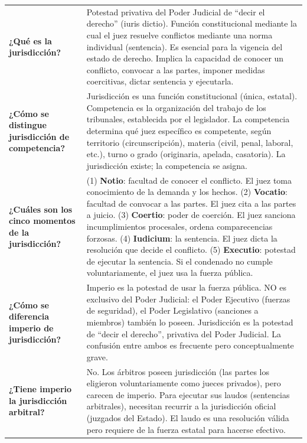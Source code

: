 \documentclass[12pt,oneside]{book}
\begin{document}
\begin{table}[H]
\begin{tabularx}{\textwidth}{
    >{\raggedright\arraybackslash}p{}
    >{\raggedright\arraybackslash}X
}
\textbf{¿Qué es la jurisdicción?} &
Potestad privativa del Poder Judicial de ``decir el derecho'' (iuris dictio). Función constitucional mediante la cual el juez resuelve conflictos mediante una norma individual (sentencia). Es esencial para la vigencia del estado de derecho. Implica la capacidad de conocer un conflicto, convocar a las partes, imponer medidas coercitivas, dictar sentencia y ejecutarla. \\

\textbf{¿Cómo se distingue jurisdicción de competencia?} &
Jurisdicción es una función constitucional (única, estatal). Competencia es la organización del trabajo de los tribunales, establecida por el legislador. La competencia determina qué juez específico es competente, según territorio (circunscripción), materia (civil, penal, laboral, etc.), turno o grado (originaria, apelada, casatoria). La jurisdicción existe; la competencia se asigna. \\

\textbf{¿Cuáles son los cinco momentos de la jurisdicción?} &
(1) \textbf{Notio}: facultad de conocer el conflicto. El juez toma conocimiento de la demanda y los hechos. (2) \textbf{Vocatio}: facultad de convocar a las partes. El juez cita a las partes a juicio. (3) \textbf{Coertio}: poder de coerción. El juez sanciona incumplimientos procesales, ordena comparecencias forzosas. (4) \textbf{Iudicium}: la sentencia. El juez dicta la resolución que decide el conflicto. (5) \textbf{Executio}: potestad de ejecutar la sentencia. Si el condenado no cumple voluntariamente, el juez usa la fuerza pública. \\

\textbf{¿Cómo se diferencia imperio de jurisdicción?} &
Imperio es la potestad de usar la fuerza pública. NO es exclusivo del Poder Judicial: el Poder Ejecutivo (fuerzas de seguridad), el Poder Legislativo (sanciones a miembros) también lo poseen. Jurisdicción es la potestad de ``decir el derecho'', privativa del Poder Judicial. La confusión entre ambos es frecuente pero conceptualmente grave. \\

\textbf{¿Tiene imperio la jurisdicción arbitral?} &
No. Los árbitros poseen jurisdicción (las partes los eligieron voluntariamente como jueces privados), pero carecen de imperio. Para ejecutar sus laudos (sentencias arbitrales), necesitan recurrir a la jurisdicción oficial (juzgados del Estado). El laudo es una resolución válida pero requiere de la fuerza estatal para hacerse efectivo. \\


\end{tabularx}
\end{table}
\end{document}
